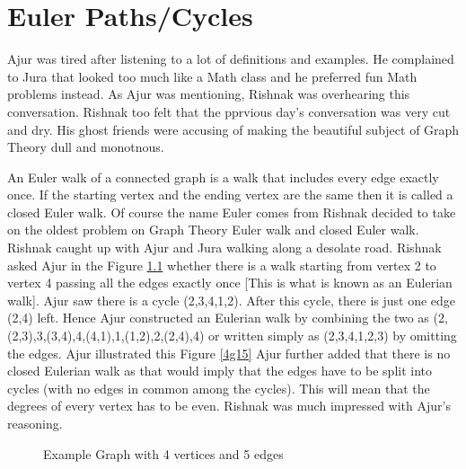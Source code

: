 \chapter{Euler Paths/Cycles}

Ajur was tired after listening to a lot of definitions and examples. He complained to Jura that looked too much like a Math class and he preferred fun Math problems instead. As Ajur was mentioning, Rishnak was overhearing this conversation. Rishnak too felt that the pprvious day's conversation was very cut and dry. His ghost friends were accusing of making the beautiful subject of Graph Theory dull and monotnous.


An Euler walk of a connected graph is a walk that includes every edge exactly once. If the starting vertex and the ending vertex are the same then it is called a closed Euler walk. Of course the name Euler comes from 
Rishnak decided to take on the oldest problem on Graph Theory Euler walk and closed Euler walk. Rishnak caught up with Ajur and Jura walking along a desolate road. Rishnak asked Ajur in the Figure \ref{4g1} whether there is a walk starting from vertex 2 to vertex 4 passing all the edges exactly once [This is what is known as an Eulerian walk]. Ajur saw there is a cycle (2,3,4,1,2). After this cycle, there is just one edge (2,4) left. Hence Ajur constructed an Eulerian walk by combining the two as (2,(2,3),3,(3,4),4,(4,1),1,(1,2),2,(2,4),4) or written simply as (2,3,4,1,2,3) by omitting the edges. Ajur illustrated this Figure \ref{4g15} Ajur further added that there is no closed Eulerian walk as that would imply that the edges have to be split into cycles (with no edges in common among the cycles). This will mean that the degrees of every vertex has to be even. Rishnak was much impressed with Ajur's reasoning. 


\begin{figure}
\begin{center}
\caption{ Example Graph with 4 vertices and 5 edges}\label{4g1}
\end{center}
\end{figure}

